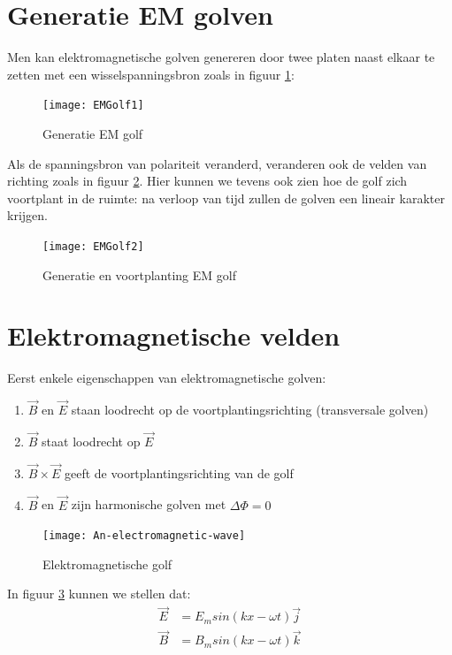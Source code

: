 \documentclass[a4paper,kul]{kulakarticle} %
\begin{document}
\section{Generatie EM golven}
Men kan elektromagnetische golven genereren door twee platen naast elkaar te zetten met een wisselspanningsbron zoals in figuur \ref{fig:emgolf1}:
\begin{figure}[h]
	\centering
	\texttt{[image: EMGolf1]}
	\caption[Generatie]{Generatie EM golf}
	\label{fig:emgolf1}
\end{figure}
Als de spanningsbron van polariteit veranderd, veranderen ook de velden van richting zoals in figuur \ref{fig:emgolf2}. Hier kunnen we tevens ook zien hoe de golf zich voortplant in de ruimte: na verloop van tijd zullen de golven een lineair karakter krijgen. 
\begin{figure}[h]
	\centering
	\texttt{[image: EMGolf2]}
	\caption[Generatie en voortplanting]{Generatie en voortplanting EM golf}
	\label{fig:emgolf2}
\end{figure}
\newpage
\section{Elektromagnetische velden}
Eerst enkele eigenschappen van elektromagnetische golven:
\begin{enumerate}
	\item $\vec{B}$ en $\vec{E}$ staan loodrecht op de voortplantingsrichting (transversale golven)
	\item $\vec{B}$ staat loodrecht op $\vec{E}$
	\item $\vec{B} \times\vec{E}$ geeft de voortplantingsrichting van de golf
	\item $\vec{B}$ en $\vec{E}$ zijn harmonische golven met $\Delta\Phi = 0$
\end{enumerate}
\begin{figure}[h]
	\centering
	\texttt{[image: An-electromagnetic-wave]}
	\caption[Elektromagnetische golf]{Elektromagnetische golf}
	\label{fig:an-electromagnetic-wave}
\end{figure}
In figuur \ref{fig:an-electromagnetic-wave} kunnen we stellen dat:
\begin{align*}
	\vec{E} &= E_msin(kx-\omega t)\vec{j}\\
	\vec{B} &= B_msin(kx-\omega t)\vec{k}
\end{align*}
\newpage
\end{document}
